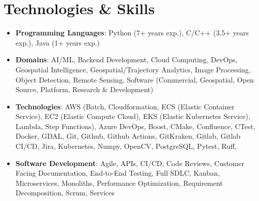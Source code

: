 \documentclass[letterpaper,10pt]{article}
\makeatletter
\newcommand{\resumeAwardItem}[3]{
  \item
    \begin{tabular*}{0.97\textwidth}{l@{\extracolsep{\fill}}r}
      \textbf{#1} \textit{\small #2} & \textit{\small #3} \\
    \end{tabular*}
}
\newcommand{\resumeSubHeadingListStart}{\begin{itemize}[leftmargin=*]}
\newcommand{\resumeSubHeadingListEnd}{\end{itemize}}
\makeatother
\begin{document}
\section{Technologies \& Skills}
 \resumeSubHeadingListStart
   \item\small{
     \textbf{Programming Languages}{:
      Python (7+ years exp.),
      C/C++ (3.5+ years exp.),
      Java (1+ years exp.)
     }
   }
   \item\small{
    \textbf{Domains}{:
      AI/ML,
      Backend Development,
      Cloud Computing,
      DevOps,
      Geospatial Intelligence,
      Geospatial/Trajectory Analytics,
      Image Processing,
      Object Detection,
      Remote Sensing,
      Software (Commercial, Geospatial, Open Source, Platform, Research \& Development)
    }
   }
   \item\small{
    \textbf{Technologies}{:
      AWS (Batch, Cloudformation, ECS (Elastic Container Service), EC2 (Elastic Compute Cloud), EKS (Elastic Kubernetes Service), Lambda, Step Functions),
      Azure DevOps,
      Boost,
      CMake,
      Confluence,
      CTest,
      Docker,
      GDAL,
      Git,
      Github,
      Github Actions,
      GitKraken,
      Gitlab,
      Gitlab CI/CD,
      Jira,
      Kubernetes,
      Numpy,
      OpenCV,
      PostgreSQL,
      Pytest,
      Ruff,
    }
   }
   \item\small{
    \textbf{Software Development}{:
      Agile,
      APIs,
      CI/CD,
      Code Reviews,
      Customer Facing Documentation,
      End-to-End Testing,
      Full SDLC,
      Kanban,
      Microservices,
      Monoliths,
      Performance Optimization,
      Requirement Decomposition,
      Scrum,
      Services
    }
   }
 \resumeSubHeadingListEnd



\end{document}

